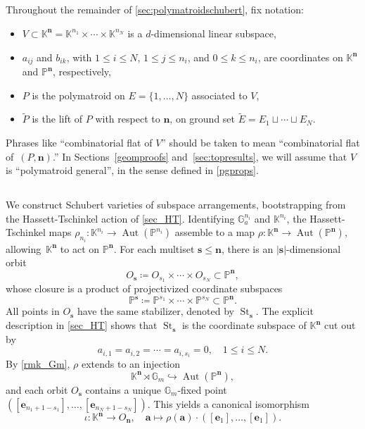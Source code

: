 \documentclass[11pt]{article}
\theoremstyle{definition}
\numberwithin{equation}{section}
\DeclareMathOperator{\Aut}{Aut}
\renewcommand{\P}{\mathbb{P}}
\newcommand{\Gm}{\mathbb{G}_m}
\newcommand{\G}{\mathbb{G}}
\DeclareMathOperator{\St}{St}
\newcommand{\K}{\mathbb{K}}
\newcommand{\revision}[1]{{#1}}
\begin{document}
\subsection{} Throughout the remainder of \cref{sec:polymatroidschubert}, fix notation:
\begin{itemize}
\item $V \subset \K^{\mathbf n} = \K^{n_1} \times \cdots \times \K^{n_N}$ is a $d$-dimensional linear subspace,
\item $a_{ij}$ and $b_{ik}$, with $1 \leq i \leq N$, $1 \leq j \leq n_i$, and $0 \leq k \leq n_i$, are coordinates on $\K^{\mathbf n}$ and $\P^{\mathbf n}$, respectively,
\item $P$ is the polymatroid on $E = \{1, \ldots, N\}$ associated to $V$,
\item $\widetilde P$ is the lift of $P$ with respect to $\mathbf n$, on ground set $\widetilde E = E_1 \sqcup \cdots \sqcup E_N$.
\end{itemize}
Phrases like ``combinatorial flat of $V$'' should be taken to mean ``combinatorial flat of~$(P, \mathbf n)$.''
In Sections~\ref{geomproofs} and~\ref{sec:topresults}, we will assume that $V$ is ``polymatroid general'', in the sense defined in \cref{pgprops}.

\subsection{}\label{polymatschubertdfn}
We construct Schubert varieties of subspace arrangements, bootstrapping from the Hassett-Tschinkel action of \cref{sec_HT}.
\revision{Identifying $\G_a^{n_i}$ and $\K^{n_i}$,} the Hassett-Tschinkel maps $\rho_{n_i}: \K^{n_i} \to \Aut(\P^{n_i})$ assemble to a map
$\rho: \K^{\mathbf n} \to \Aut(\P^{\mathbf n})$, allowing~$\K^{\mathbf n}$ to act on $\P^{\mathbf n}$.
For each multiset $\mathbf s \leq \mathbf n$, there is an $|\mathbf s|$-dimensional orbit
\[
O_{\mathbf s} \coloneqq O_{s_1} \times \cdots \times O_{s_N} \subset \P^{\mathbf n},
\]
whose closure is a product of projectivized coordinate subspaces 
\[
\P^{\mathbf s} \coloneqq \P^{s_1} \times \cdots \times \P^{s_N} \subset \P^{\mathbf n}.
\]
All points in $O_{\mathbf s}$ have the same stabilizer, denoted by $\St_{\mathbf s}$.
The explicit description in \cref{sec_HT} shows that $\St_{\mathbf s}$ is the coordinate subspace of $\K^{\mathbf n}$ cut out by
\[
  a_{i,1} = a_{i,2} = \cdots = a_{i,s_i} = 0, \quad 1 \leq i \leq N.
\]
By \cref{rmk_Gm}, $\rho$ extends to an injection
\[ \K^{\mathbf n}  \rtimes \Gm \hookrightarrow \Aut(\P^{\mathbf n}), \]
and each orbit $O_{\mathbf s}$ contains a unique $\Gm$-fixed point $([\mathbf e_{n_1 +1 - s_1}], \ldots, [\mathbf e_{n_N +1 - s_N}])$.
This yields a canonical isomorphism
\[ \iota: \K^{\mathbf n} \to O_{\mathbf n},  \quad \mathbf a \mapsto \rho(\mathbf a) \cdot ([\mathbf e_{1}], \ldots, [\mathbf e_{1}]). \]
\end{document}
